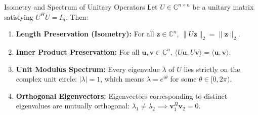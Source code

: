 \begin{theorembox}{Isometry and Spectrum of Unitary Operators}
Let $U \in \mathbb{C}^{n \times n}$ be a unitary matrix satisfying $U^H U = I_n$. Then:
\begin{enumerate}
    \item \textbf{Length Preservation (Isometry):} For all $\mathbf{z} \in \mathbb{C}^n$, $\|U\mathbf{z}\|_2 = \|\mathbf{z}\|_2$.
    \item \textbf{Inner Product Preservation:} For all $\mathbf{u}, \mathbf{v} \in \mathbb{C}^n$, $\langle U\mathbf{u}, U\mathbf{v} \rangle = \langle \mathbf{u}, \mathbf{v} \rangle$.
    \item \textbf{Unit Modulus Spectrum:} Every eigenvalue $\lambda$ of $U$ lies strictly on the complex unit circle: $|\lambda| = 1$, which means $\lambda = e^{i\theta}$ for some $\theta \in [0, 2\pi)$.
    \item \textbf{Orthogonal Eigenvectors:} Eigenvectors corresponding to distinct eigenvalues are mutually orthogonal: $\lambda_1 \ne \lambda_2 \implies \mathbf{v}_1^H \mathbf{v}_2 = 0$.
\end{enumerate}
\end{theorembox}

